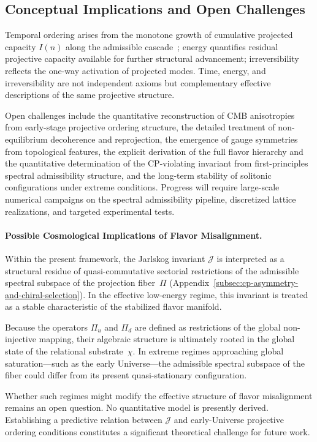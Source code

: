 \subsection{Conceptual Implications and Open Challenges}
  \label{subsec:conceptual-implications-and-open-challenges}

  Temporal ordering arises from the monotone growth of cumulative projected
  capacity $I(n)$ along the admissible cascade~\cite{Beau2026pto};
  energy quantifies residual projective capacity available for further structural
  advancement; irreversibility reflects the one-way activation of projected modes.
  Time, energy, and irreversibility are not independent axioms but complementary
  effective descriptions of the same projective structure.

  Open challenges include the quantitative reconstruction of CMB anisotropies from
  early-stage projective ordering structure, the detailed treatment of non-equilibrium
  decoherence and reprojection, the emergence of gauge symmetries from topological
  features, the explicit derivation of the full flavor hierarchy and the quantitative
  determination of the CP-violating invariant from first-principles spectral admissibility
  structure, and the long-term stability of solitonic configurations under extreme
  conditions.
  Progress will require large-scale numerical campaigns on the spectral admissibility
  pipeline, discretized lattice realizations, and targeted experimental tests.

  \paragraph{Possible Cosmological Implications of Flavor Misalignment.}

    Within the present framework, the Jarlskog invariant $\mathcal{J}$ is interpreted
    as a structural residue of quasi-commutative sectorial restrictions of the admissible
    spectral subspace of the projection fiber~$\Pi$
    (Appendix~\ref{subsec:cp-asymmetry-and-chiral-selection}).
    In the effective low-energy regime, this invariant is treated as
    a stable characteristic of the stabilized flavor manifold.

    Because the operators $\Pi_u$ and $\Pi_d$ are defined as
    restrictions of the global non-injective mapping,
    their algebraic structure is ultimately rooted in the global
    state of the relational substrate~$\chi$.
    In extreme regimes approaching global saturation---such as the
    early Universe---the admissible spectral subspace of the fiber
    could differ from its present quasi-stationary configuration.

    Whether such regimes might modify the effective structure of
    flavor misalignment remains an open question.
    No quantitative model is presently derived.
    Establishing a predictive relation between $\mathcal{J}$ and
    early-Universe projective ordering conditions constitutes a
    significant theoretical challenge for future work.
